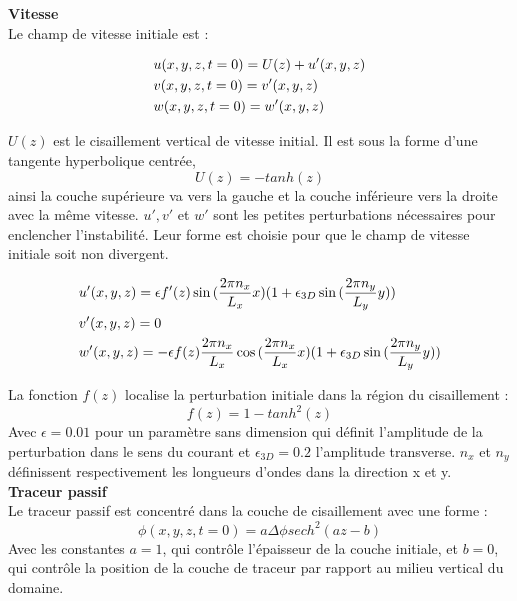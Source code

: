 \documentclass[a4paper,12pt]{article}
\begin{document}
    \newline
    \textbf{Vitesse} \\
    Le champ de vitesse initiale est : 
    \begin{subequation}
    \begin{align}
        \displaystyle
            \label{u_ini}
            & u(x,y,z,t=0)=U(z)+u'(x,y,z) \\
            \label{v_ini}
            & v(x,y,z,t=0)=v'(x,y,z) \\
            \label{w_ini}
            & w(x,y,z,t=0)=w'(x,y,z)
    \end{align}
    \end{subequation}
    $U(z)$ est le cisaillement vertical de vitesse initial. Il est sous la forme d'une tangente hyperbolique centrée,
    \begin{equation}
        \label{u0_ini}
        U(z)=-tanh(z)
    \end{equation}
    ainsi la couche supérieure va vers la gauche et la couche inférieure vers la droite avec la même vitesse. $u', v'$ et $w'$ sont les petites perturbations nécessaires pour enclencher l'instabilité. Leur forme est choisie pour que le champ de vitesse initiale soit non divergent.
    \begin{subequation}
        \begin{align}
        \displaystyle
            \label{u'_ini}
            & u'(x,y,z)=\epsilon f'(z)\sin{(\frac{2\pi n_x}{L_x}x)}(1+\epsilon_{3D}\sin{(\frac{2\pi n_y}{L_y}y)}) \\
            \label{v'_ini}
            & v'(x,y,z)=0 \\
            \label{w'_ini}
            & w'(x,y,z)=-\epsilon f(z)\frac{2\pi n_x}{L_x}\cos{(\frac{2\pi n_x}{L_x}x)}(1+\epsilon_{3D}\sin{(\frac{2\pi n_y}{L_y}y)})
        \end{align}
    \end{subequation}
    La fonction $f(z)$ localise la perturbation initiale dans la région du cisaillement : 
    \begin{equation}
        f(z)=1-tanh^2(z)
    \end{equation}
    Avec $\epsilon=0.01$ pour un paramètre sans dimension qui définit l'amplitude de la perturbation dans le sens du courant et $\epsilon_{3D}=0.2$ l'amplitude transverse. $n_x$ et $n_y$ définissent respectivement les longueurs d'ondes dans la direction x et y. \\
    \newline
    \textbf{Traceur passif} \\
    Le traceur passif est concentré dans la couche de cisaillement avec une forme :
    \begin{equation}
    \label{phi_ini}
        \phi(x,y,z,t=0)= a\Delta\phi sech^2(az-b)
    \end{equation}
    Avec les constantes $a=1$, qui contrôle l'épaisseur de la couche initiale, et $b=0$, qui contrôle la position de la couche de traceur par rapport au milieu vertical du domaine. 
    
\end{document}
